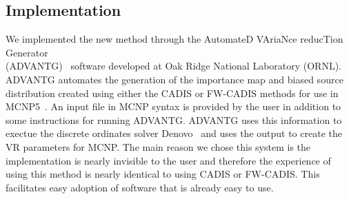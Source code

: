 \documentclass[12pt]{article}
\begin{document}
%
% 

%

\subsection{Implementation}
\label{subsect::implementation}

We implemented the new method through the AutomateD VAriaNce reducTion Generator\\ (ADVANTG)~\cite{wagner_automated_2002, mosher_new_2010} software developed at Oak Ridge National Laboratory (ORNL). 
ADVANTG automates the generation of the importance map and biased source distribution created using either the CADIS or FW-CADIS methods for use in MCNP5~\cite{brown_mcnp_2002}. 
An input file in MCNP syntax is provided by the user in addition to some instructions for running ADVANTG. 
ADVANTG uses this information to exectue the discrete ordinates solver Denovo~\cite{evans_denovo:_2010} and uses the output to create the VR parameters for MCNP.
The main reason we chose this system is the implementation is nearly invisible to the user and therefore the experience of using this method is nearly identical to using CADIS or FW-CADIS.
This facilitates easy adoption of software that is already easy to use.
\end{document}
